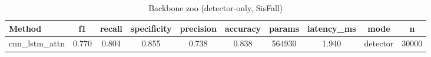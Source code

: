\begin{table}[t]
\centering
\caption{Backbone zoo (detector-only, SisFall)}
\begin{tabular}{lccccccccc}
\toprule
Method & f1 & recall & specificity & precision & accuracy & params & latency_ms & mode & n \\
\midrule
cnn_lstm_attn & 0.770 & 0.804 & 0.855 & 0.738 & 0.838 & 564930 & 1.940 & detector & 30000 \\
\bottomrule
\end{tabular}
\end{table}